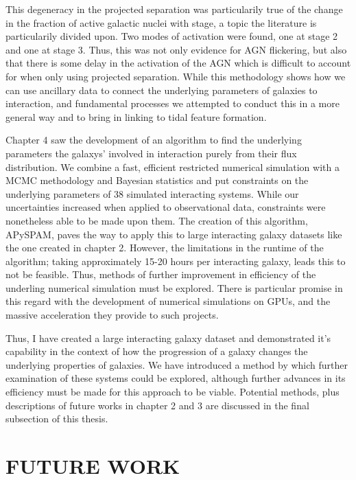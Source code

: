 This degeneracy in the projected separation was particularily true of the change in the fraction of active galactic nuclei with stage, a topic the literature is particularily divided upon. Two modes of activation were found, one at stage 2 and one at stage 3. Thus, this was not only evidence for AGN flickering, but also that there is some delay in the activation of the AGN which is difficult to account for when only using projected separation. While this methodology shows how we can use ancillary data to connect the underlying parameters of galaxies to interaction, and fundamental processes we attempted to conduct this in a more general way and to bring in linking to tidal feature formation. 

Chapter 4 saw the development of an algorithm to find the underlying parameters the galaxys' involved in interaction purely from their flux distribution. We combine a fast, efficient restricted numerical simulation with a MCMC methodology and Bayesian statistics and put constraints on the underlying parameters of 38 simulated interacting systems. While our uncertainties increased when applied to observational data, constraints were nonetheless able to be made upon them. The creation of this algorithm, APySPAM, paves the way to apply this to large interacting galaxy datasets like the one created in chapter 2. However, the limitations in the runtime of the algorithm; taking approximately 15-20 hours per interacting galaxy, leads this to not be feasible. Thus, methods of further improvement in efficiency of the underling numerical simulation must be explored. There is particular promise in this regard with the development of numerical simulations on GPUs, and the massive acceleration they provide to such projects.

Thus, I have created a large interacting galaxy dataset and demonstrated it's capability in the context of how the progression of a galaxy changes the underlying properties of galaxies. We have introduced a method by which further examination of these systems could be explored, although further advances in its efficiency must be made for this approach to be viable. Potential methods, plus descriptions of future works in chapter 2 and 3 are discussed in the final subsection of this thesis.

\section{FUTURE WORK}
